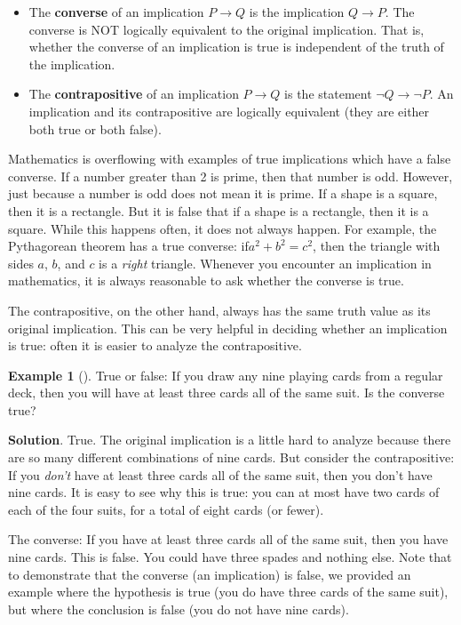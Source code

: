 \documentclass[10pt,]{book}
\newcommand{\terminology}[1]{\textbf{#1}}
\theoremstyle{plain}
\theoremstyle{definition}
\theoremstyle{definition}
\newtheorem{example}[theorem]{Example}
\theoremstyle{definition}
\theoremstyle{definition}
\numberwithin{equation}{chapter}
\def\imp{\rightarrow}
\begin{document}
\begin{assemblage}\label{assemblage-19}
\hypertarget{p-1297}{}%
%
\begin{itemize}[label=\textbullet]
\item{}\hypertarget{p-1298}{}%
The \terminology{converse}  of an implication \(P \imp Q\) is the implication \(Q \imp P\). The converse is NOT logically equivalent to the original implication.  That is, whether the converse of an implication is true is independent of the truth of the implication.%
\item{}\hypertarget{p-1299}{}%
The \terminology{contrapositive}  of an implication \(P \imp Q\) is the statement \(\neg Q \imp \neg P\). An implication and its contrapositive are logically equivalent (they are either both true or both false).%
\end{itemize}
%
\end{assemblage}
\hypertarget{p-1300}{}%
Mathematics is overflowing with examples of true implications which have a false converse. If a number greater than 2 is prime, then that number is odd. However, just because a number is odd does not mean it is prime. If a shape is a square, then it is a rectangle. But it is false that if a shape is a rectangle, then it is a square. While this happens often, it does not always happen. For example, the Pythagorean theorem has a true converse: if\(a^2 + b^2 = c^2\), then the triangle with sides \(a\), \(b\), and \(c\) is a \emph{right} triangle. Whenever you encounter an implication in mathematics, it is always reasonable to ask whether the converse is true.%
\par
\hypertarget{p-1301}{}%
The contrapositive, on the other hand, always has the same truth value as its original implication. This can be very helpful in deciding whether an implication is true: often it is easier to analyze the contrapositive.%
\begin{example}[]\label{example-34}
\hypertarget{p-1302}{}%
True or false: If you draw any nine playing cards from a regular deck, then you will have at least three cards all of the same suit. Is the converse true?%
\par\smallskip%
\noindent\textbf{Solution}.\hypertarget{solution-119}{}\quad%
\hypertarget{p-1303}{}%
True. The original implication is a little hard to analyze because there are so many different combinations of nine cards. But consider the contrapositive: If you \emph{don't} have at least three cards all of the same suit, then you don't have nine cards. It is easy to see why this is true: you can at most have two cards of each of the four suits, for a total of eight cards (or fewer).%
\par
\hypertarget{p-1304}{}%
The converse: If you have at least three cards all of the same suit, then you have nine cards. This is false. You could have three spades and nothing else. Note that to demonstrate that the converse (an implication) is false, we provided an example where the hypothesis is true (you do have three cards of the same suit), but where the conclusion is false (you do not have nine cards).%
\end{example}
\end{document}
